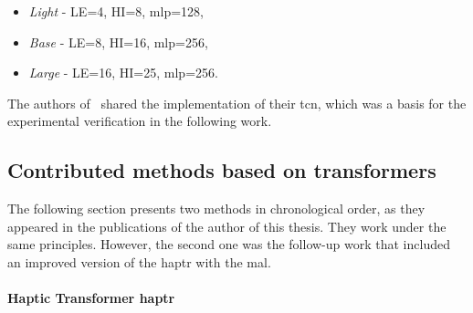 \documentclass[a4paper, 10pt, twoside]{report}
\begin{document}
\begin{itemize}
    \itemsep0pt
    \item \textit{Light} - LE=4, HI=8, \acrshort{mlp}=128,
    \item \textit{Base} - LE=8, HI=16, \acrshort{mlp}=256,
    \item \textit{Large} - LE=16, HI=25, \acrshort{mlp}=256.
\end{itemize}

The authors of~\cite{bai2018empirical} shared the implementation of their \acrshort{tcn}, which was a basis for the experimental verification in the following work.
\subsection{Contributed methods based on transformers}
\label{part:methods:terrain:haptr:contributed}

\begin{notefromauthor}
    The following section presents two methods in chronological order, as they appeared in the publications of the author of this thesis. They work under the same principles. However, the second one was the follow-up work that included an improved version of the \acrshort{haptr} with the \acrshort{mal}.
\end{notefromauthor}


\paragraph{Haptic Transformer \acrshort{haptr}}
\end{document}
